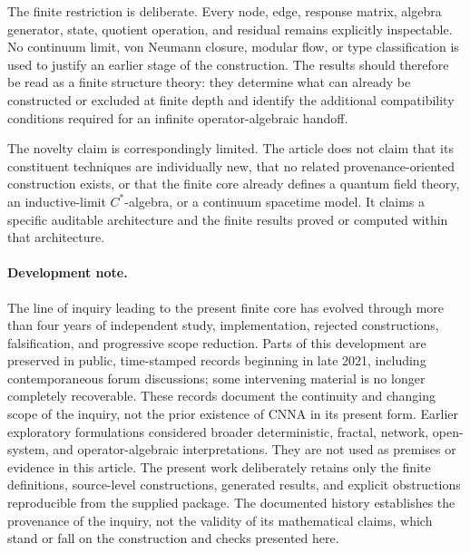 \documentclass[11pt]{article}
\theoremstyle{remark}
\numberwithin{equation}{section}
\begin{document}
The finite restriction is deliberate. Every node, edge, response matrix, algebra generator, state, quotient operation, and residual remains explicitly inspectable. No continuum limit, von Neumann closure, modular flow, or type classification is used to justify an earlier stage of the construction. The results should therefore be read as a finite structure theory: they determine what can already be constructed or excluded at finite depth and identify the additional compatibility conditions required for an infinite operator-algebraic handoff.

The novelty claim is correspondingly limited. The article does not claim that its constituent techniques are individually new, that no related provenance-oriented construction exists, or that the finite core already defines a quantum field theory, an inductive-limit $C^*$-algebra, or a continuum spacetime model. It claims a specific auditable architecture and the finite results proved or computed within that architecture.

\paragraph{Development note.} The line of inquiry leading to the present finite core has evolved through more than four years of independent study, implementation, rejected constructions, falsification, and progressive scope reduction. Parts of this development are preserved in public, time-stamped records beginning in late 2021, including contemporaneous forum discussions; some intervening material is no longer completely recoverable. These records document the continuity and changing scope of the inquiry, not the prior existence of CNNA in its present form. Earlier exploratory formulations considered broader deterministic, fractal, network, open-system, and operator-algebraic interpretations. They are not used as premises or evidence in this article. The present work deliberately retains only the finite definitions, source-level constructions, generated results, and explicit obstructions reproducible from the supplied package. The documented history establishes the provenance of the inquiry, not the validity of its mathematical claims, which stand or fall on the construction and checks presented here.
\end{document}
